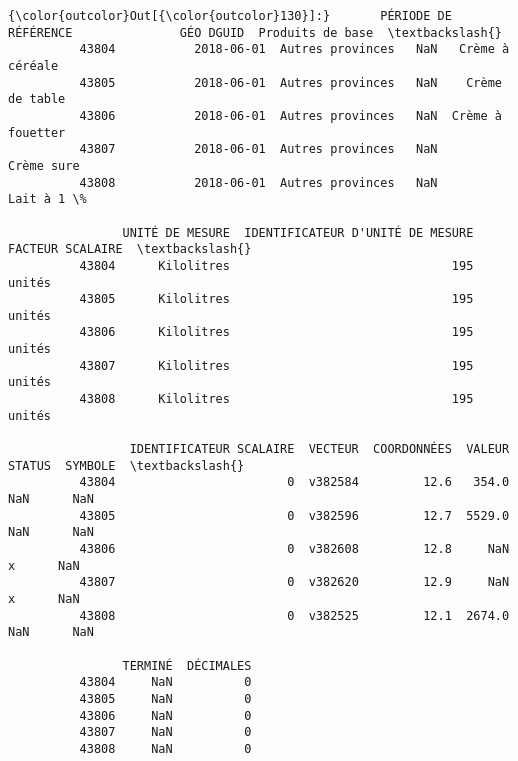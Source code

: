 \documentclass[11pt]{article}
\begin{document}
\begin{Verbatim}[commandchars=\\\{\}]
{\color{outcolor}Out[{\color{outcolor}130}]:}       PÉRIODE DE RÉFÉRENCE               GÉO DGUID  Produits de base  \textbackslash{}
          43804           2018-06-01  Autres provinces   NaN   Crème à céréale   
          43805           2018-06-01  Autres provinces   NaN    Crème de table   
          43806           2018-06-01  Autres provinces   NaN  Crème à fouetter   
          43807           2018-06-01  Autres provinces   NaN        Crème sure   
          43808           2018-06-01  Autres provinces   NaN        Lait à 1 \%   
          
                UNITÉ DE MESURE  IDENTIFICATEUR D'UNITÉ DE MESURE FACTEUR SCALAIRE  \textbackslash{}
          43804      Kilolitres                               195           unités   
          43805      Kilolitres                               195           unités   
          43806      Kilolitres                               195           unités   
          43807      Kilolitres                               195           unités   
          43808      Kilolitres                               195           unités   
          
                 IDENTIFICATEUR SCALAIRE  VECTEUR  COORDONNÉES  VALEUR STATUS  SYMBOLE  \textbackslash{}
          43804                        0  v382584         12.6   354.0    NaN      NaN   
          43805                        0  v382596         12.7  5529.0    NaN      NaN   
          43806                        0  v382608         12.8     NaN      x      NaN   
          43807                        0  v382620         12.9     NaN      x      NaN   
          43808                        0  v382525         12.1  2674.0    NaN      NaN   
          
                TERMINÉ  DÉCIMALES  
          43804     NaN          0  
          43805     NaN          0  
          43806     NaN          0  
          43807     NaN          0  
          43808     NaN          0  
\end{Verbatim}
            
\end{document}
